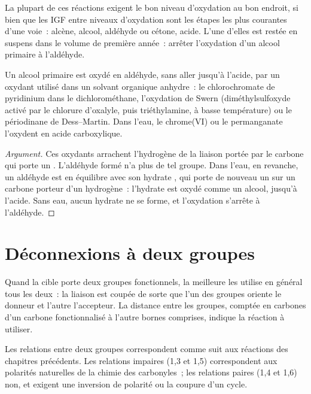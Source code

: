 La plupart de ces réactions exigent le bon niveau d'oxydation au bon endroit, si bien que les IGF entre
niveaux d'oxydation sont les étapes les plus courantes d'une voie~: alcène, alcool, aldéhyde ou cétone,
acide. L'une d'elles est restée en suspens dans le volume de première année~: arrêter l'oxydation d'un
alcool primaire à l'aldéhyde.

\begin{proposition}\label{prop:b2:retrosynthesis:mild-oxidation}
Un alcool primaire est oxydé en aldéhyde, sans aller jusqu'à l'acide, par un oxydant utilisé dans un
solvant organique anhydre~: le chlorochromate de pyridinium dans le dichlorométhane, l'oxydation de
Swern (diméthylsulfoxyde activé par le chlorure d'oxalyle, puis triéthylamine, à basse température) ou
le périodinane de Dess--Martin. Dans l'eau, le chrome(VI) ou le permanganate l'oxydent en acide carboxylique.
\end{proposition}

\begin{proof}[Argument]
Ces oxydants arrachent l'hydrogène de la liaison  portée par le carbone qui porte un .
L'aldéhyde formé n'a plus de tel groupe. Dans l'eau, en revanche, un aldéhyde est en équilibre avec son
hydrate , qui porte de nouveau un  sur un carbone porteur d'un hydrogène~: l'hydrate
est oxydé comme un alcool, jusqu'à l'acide. Sans eau, aucun hydrate ne se forme, et l'oxydation s'arrête
à l'aldéhyde.
\end{proof}

\section{Déconnexions à deux groupes}

Quand la cible porte deux groupes fonctionnels, la meilleure  les utilise en général tous
les deux~: la liaison est coupée de sorte que l'un des groupes oriente le donneur et l'autre
l'accepteur. La distance entre les groupes, comptée en carbones d'un carbone fonctionnalisé à l'autre
bornes comprises, indique la réaction à utiliser.

\begin{proposition}\label{prop:b2:retrosynthesis:patterns}
Les relations entre deux groupes correspondent comme suit aux réactions des chapitres précédents. Les
relations impaires (1,3 et 1,5) correspondent aux polarités naturelles de la chimie des carbonyles~; les
relations paires (1,4 et 1,6) non, et exigent une inversion de polarité ou la coupure d'un cycle.
\end{proposition}


